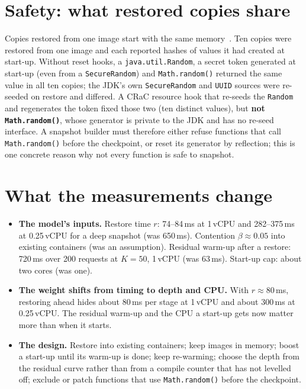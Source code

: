 \section{Safety: what restored copies share}
\label{sec:m-uniq}

Copies restored from one image start with the same memory~\cite{brooker2021}. Ten copies were
restored from one image and each reported hashes of values it had created at start-up. Without
reset hooks, a \texttt{java.util.Random}, a secret token generated at start-up (even from a
\texttt{SecureRandom}) and \texttt{Math.random()} returned the same value in all ten copies; the
JDK's own \texttt{SecureRandom} and \texttt{UUID} sources were re-seeded on restore and differed.
A CRaC resource hook that re-seeds the \texttt{Random} and regenerates the token fixed those two
(ten distinct values), but \textbf{not \texttt{Math.random()}}, whose generator is private to the
JDK and has no re-seed interface. A snapshot builder must therefore either refuse functions that
call \texttt{Math.random()} before the checkpoint, or reset its generator by reflection; this is
one concrete reason why not every function is safe to snapshot.

\section{What the measurements change}
\label{sec:m-changes}

\begin{itemize}
\item \textbf{The model's inputs.} Restore time $r$: 74--84\,ms at 1\,vCPU and 282--375\,ms at
      0.25\,vCPU for a deep snapshot (was 650\,ms). Contention $\beta \approx 0.05$ into existing
      containers (was an assumption). Residual warm-up after a restore: 720\,ms over 200 requests
      at $K = 50$, 1\,vCPU (was 63\,ms). Start-up cap: about two cores (was one).
\item \textbf{The weight shifts from timing to depth and CPU.} With $r \approx 80$\,ms, restoring
      ahead hides about 80\,ms per stage at 1\,vCPU and about 300\,ms at 0.25\,vCPU. The residual
      warm-up and the CPU a start-up gets now matter more than when it starts.
\item \textbf{The design.} Restore into existing containers; keep images in memory; boost a
      start-up until its warm-up is done; keep re-warming; choose the depth from the residual
      curve rather than from a compile counter that has not levelled off; exclude or patch
      functions that use \texttt{Math.random()} before the checkpoint.
\end{itemize}

